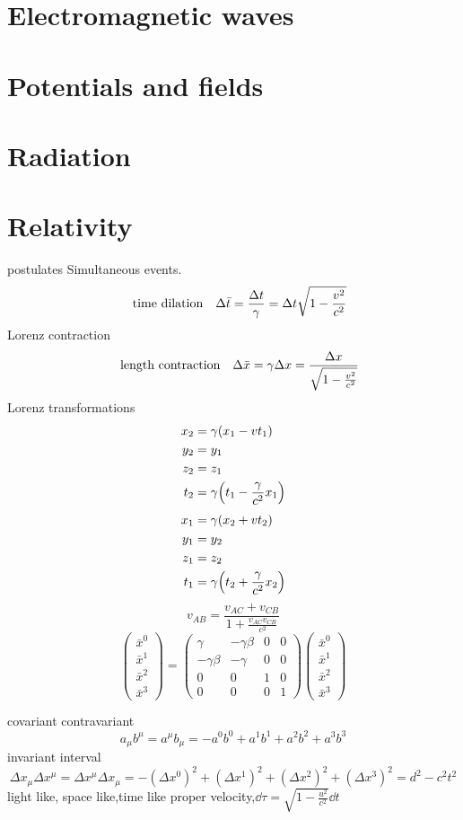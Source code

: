 \documentclass[12pt]{article}
\begin{document}
\section{Electromagnetic waves}

\section{Potentials and fields}

\section{Radiation}

\section{Relativity}
postulates
Simultaneous events.
\[\qq{time dilation} \Delta{\bar{t}}=\frac{\Delta{t}}{\gamma}=\Delta{t}\sqrt{1-\frac{v^2}{c^2}}\]
Lorenz contraction
\[\qq{length contraction} \Delta{\bar{x}}=\gamma\Delta{x}=\frac{\Delta{x}}{\sqrt{1-\frac{v^2}{c^2}}}\]
Lorenz transformations 
\begin{align*}
x_2&=\gamma(x_1-vt_1)\\y_2&=y_1\\z_2&=z_1\\t_2&=\gamma\qty(t_1-\frac{\gamma}{c^2}x_1)
\end{align*}
\begin{align*}
x_1&=\gamma(x_2+vt_2)\\y_1&=y_2\\z_1&=z_2\\t_1&=\gamma\qty(t_2+\frac{\gamma}{c^2}x_2)
\end{align*}
\[v_{AB}=\frac{v_{AC}+v_{CB}}{1+\frac{v_{AC}v_{CB}}{c^2}}\]
\[
\begin{pmatrix}
\bar{x}^0\\ \bar{x}^1\\ \bar{x}^2\\ \bar{x}^3
\end{pmatrix}
=
\begin{pmatrix}
\gamma& -\gamma\beta& 0& 0\\
-\gamma\beta& -\gamma& 0& 0\\
0& 0& 1& 0\\
0& 0& 0& 1
\end{pmatrix}
\begin{pmatrix}
\bar{x}^0\\ \bar{x}^1\\ \bar{x}^2\\ \bar{x}^3
\end{pmatrix}
\]

covariant contravariant
\[a_{\mu}b^{\mu}=a^{\mu}b_{\mu}=-a^{0}b^{0}+a^{1}b^{1}+a^{2}b^{2}+a^{3}b^{3}\]
invariant interval\[\Delta{x}_{\mu}\Delta{x}^{\mu}=\Delta{x}^{\mu}\Delta{x}_{\mu}=-(\Delta{x}^{0})^2+(\Delta{x}^{1})^2+(\Delta{x}^{2})^2+(\Delta{x}^{3})^2=d^2-c^2t^2\]
light like, space like,time like
proper velocity,$\dd{\tau}=\sqrt{1-\frac{u^2}{c^2}}\dd{t}$
\end{document}
